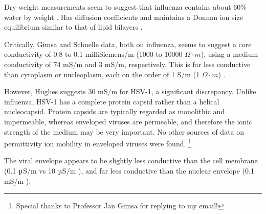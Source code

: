 \documentclass[fleqn,10pt]{paper}
\begin{document}
Dry-weight measurements seem to suggest that influenza contains about 60\% water by weight \cite{lauffer1944biophysical}. Has diffusion coefficients and maintains a Donnan ion size equilibrium similar to that of lipid bilayers \cite{Effect2015b}. 


% 



Critically, Gimsa and Schnelle data, both on influenza, seems to suggest a core conductivity of 0.8 to 0.1 milliSiemens/m (1000 to 10000 $\Omega \cdot m$), using a medium conductivity of 74 mS/m and 3 mS/m, respectively. This is far less conductive than cytoplasm or nucleoplasm, each on the order of 1 S/m (1 $\Omega \cdot m$) \cite{Study2001}. 



However, Hughes suggests 30 mS/m for HSV-1, a significant discrepancy. Unlike influenza, HSV-1 has a complete protein capsid rather than a helical nucleocapsid. Protein capsids are typically regarded as monolithic and impermeable, whereas enveloped viruses are permeable, and therefore the ionic strength of the medium may be very important. No other sources of data on permittivity ion mobility in enveloped viruses were found.  \footnote{Special thanks to Professor Jan Gimsa for replying to my email!}

The viral envelope appears to be slightly less conductive than the cell membrane (0.1 $\micro$S/m \cite{New1999} vs 10 $\micro$S/m \cite{Study2001}), and far less conductive than the nuclear envelope (0.1 $\text{m}$S/m \cite{Study2001}).
\end{document}
